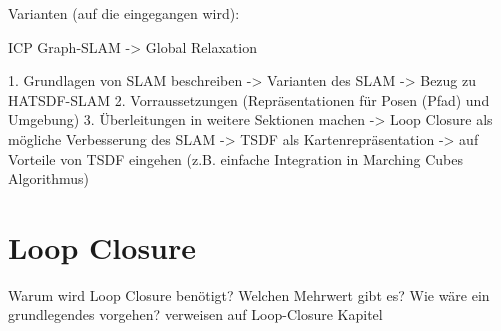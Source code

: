 
Varianten (auf die eingegangen wird): 

ICP
Graph-SLAM -> Global Relaxation


 

1. Grundlagen von SLAM beschreiben
-> Varianten des SLAM
-> Bezug zu HATSDF-SLAM
2. Vorraussetzungen (Repräsentationen für Posen (Pfad) und Umgebung)
3. Überleitungen in weitere Sektionen machen
	-> Loop Closure als mögliche Verbesserung des SLAM
	-> TSDF als Kartenrepräsentation
		-> auf Vorteile von TSDF eingehen (z.B. einfache Integration in Marching Cubes Algorithmus)



\section{Loop Closure}
\label{section:loop_closure_basics}

Warum wird Loop Closure benötigt?
Welchen Mehrwert gibt es?
Wie wäre ein grundlegendes vorgehen?
verweisen auf Loop-Closure Kapitel
